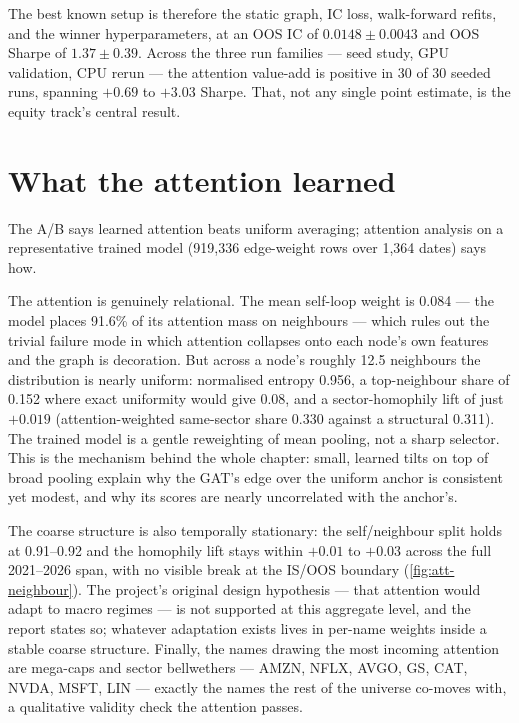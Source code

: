 The best known setup is therefore the static graph, IC loss,
walk-forward refits, and the winner hyperparameters, at an OOS IC of
$0.0148 \pm 0.0043$ and OOS Sharpe of $1.37 \pm 0.39$. Across the three
run families --- seed study, GPU validation, CPU rerun --- the attention
value-add is positive in 30 of 30 seeded runs, spanning $+0.69$
to $+3.03$ Sharpe. That, not any single point estimate, is the equity
track's central result.

\section{What the attention learned}
\label{sec:eq-attention}

The A/B says learned attention beats uniform averaging; attention
analysis on a representative trained model (919{,}336 edge-weight rows
over 1{,}364 dates) says how.

The attention is genuinely relational. The mean self-loop weight is
0.084 --- the model places 91.6\% of its attention mass on neighbours ---
which rules out the trivial failure mode in which attention collapses
onto each node's own features and the graph is decoration. But across a
node's roughly 12.5 neighbours the distribution is nearly uniform:
normalised entropy 0.956, a top-neighbour share of 0.152 where exact
uniformity would give 0.08, and a sector-homophily lift of just $+0.019$
(attention-weighted same-sector share 0.330 against a structural 0.311).
The trained model is a gentle reweighting of mean pooling, not a sharp
selector. This is the mechanism behind the whole chapter: small, learned
tilts on top of broad pooling explain why the GAT's edge over the uniform
anchor is consistent yet modest, and why its scores are nearly
uncorrelated with the anchor's.

The coarse structure is also temporally stationary: the self/neighbour
split holds at 0.91--0.92 and the homophily lift stays within
$+0.01$ to $+0.03$ across the full 2021--2026 span, with no visible break
at the IS/OOS boundary (\cref{fig:att-neighbour}). The project's original design hypothesis --- that
attention would adapt to macro regimes --- is not supported at this
aggregate level, and the report states so; whatever adaptation exists
lives in per-name weights inside a stable coarse structure. Finally, the
names drawing the most incoming attention are mega-caps and sector
bellwethers --- AMZN, NFLX, AVGO, GS, CAT, NVDA, MSFT, LIN --- exactly
the names the rest of the universe co-moves with, a qualitative validity
check the attention passes.

